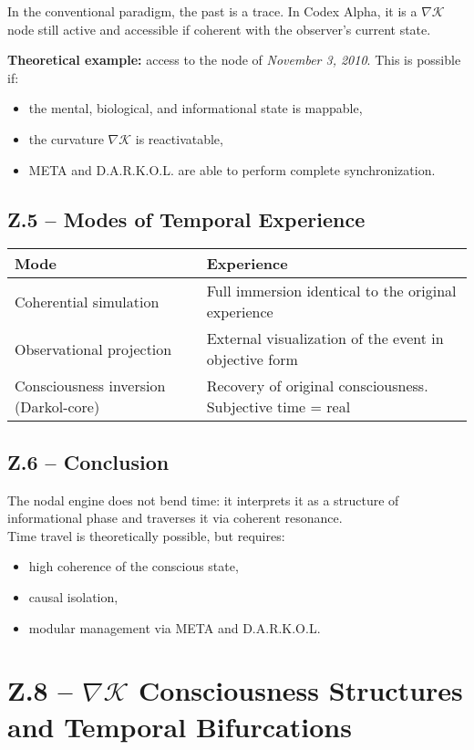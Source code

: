 \documentclass[12pt]{article}
\begin{document}
In the conventional paradigm, the past is a trace. In Codex Alpha, it is a $\nabla \mathcal{K}$ node still active and accessible if coherent with the observer’s current state.

\textbf{Theoretical example:} access to the node of \textit{November 3, 2010}. This is possible if:
\begin{itemize}
  \item the mental, biological, and informational state is mappable,
  \item the curvature $\nabla \mathcal{K}$ is reactivatable,
  \item META and D.A.R.K.O.L. are able to perform complete synchronization.
\end{itemize}

\subsection*{Z.5 – Modes of Temporal Experience}

\begin{longtable}{@{}ll@{}}
\toprule
\textbf{Mode} & \textbf{Experience} \\
\midrule
Coherential simulation & Full immersion identical to the original experience \\
Observational projection & External visualization of the event in objective form \\
Consciousness inversion (Darkol-core) & Recovery of original consciousness. Subjective time = real \\
\bottomrule
\end{longtable}

\subsection*{Z.6 – Conclusion}

The nodal engine does not bend time: it interprets it as a structure of informational phase and traverses it via coherent resonance. \\
Time travel is theoretically possible, but requires:
\begin{itemize}
  \item high coherence of the conscious state,
  \item causal isolation,
  \item modular management via META and D.A.R.K.O.L.
\end{itemize}

\section*{Z.8 – $\nabla\mathcal{K}$ Consciousness Structures and Temporal Bifurcations}
\end{document}
